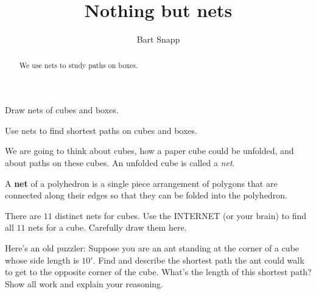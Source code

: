 \documentclass[noauthor,nooutcomes,hints,handout]{ximera}
\title{Nothing but nets}
\author{Bart Snapp}
\begin{document}
\begin{abstract}
  We use nets to study paths on boxes.
\end{abstract}
\maketitle

\begin{listOutcomes}
\item Draw nets of cubes and boxes.
\item Use nets to find shortest paths on cubes and boxes.
\end{listOutcomes}



We are going to think about cubes, how a paper cube could be unfolded, and about paths on these cubes. An unfolded cube is called a \textit{net}.


\begin{definition}
  A \textbf{net} of a polyhedron is a
  single piece arrangement of polygons that are connected along their
  edges so that they can be folded into the polyhedron.
\end{definition}


\mynewpage


\begin{question}
  There are $11$ distinct nets for cubes. Use the INTERNET (or your
  brain) to find all $11$ nets for a cube. Carefully draw them here.
  
\end{question}
\mynewpage

\begin{question}
  Here's an old puzzler: Suppose you are an ant standing at the corner
  of a cube whose side length is $10'$. Find and describe the shortest
  path the ant could walk to get to the opposite corner of the cube. What's the
  length of this shortest path? Show all work and explain your reasoning.
\end{question}
\mynewpage
\end{document}
